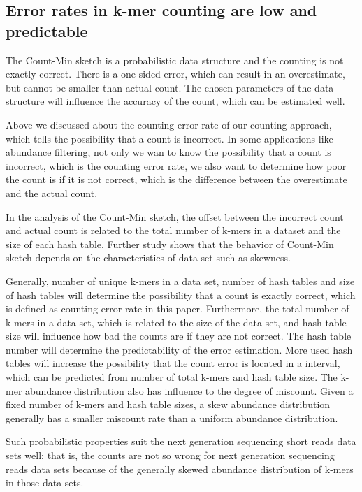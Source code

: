 \documentclass{article}
\begin{document}
\subsection{Error rates in k-mer counting are low and predictable}

The Count-Min sketch is a probabilistic data structure and the
counting is not exactly correct. There is a one-sided error, which can
result in an overestimate, but cannot be smaller than actual
count. The chosen parameters of the data structure will influence the
accuracy of the count, which can be estimated well\cite{Cormode2005}.

Above we discussed about the counting error rate of our counting
approach, which tells the possibility that a count is incorrect.  In
some applications like abundance filtering, not only we wan to know
the possibility that a count is incorrect, which is the counting error
rate, we also want to determine how poor the count is if it is not
correct, which is the difference between the overestimate and the
actual count.

In the analysis of the Count-Min sketch\cite{Cormode2005}, the offset
between the incorrect count and actual count is related to the total
number of k-mers in a dataset and the size of each hash table. Further
study shows that the behavior of Count-Min sketch depends on the
characteristics of data set such as skewness\cite{Rusu2008}.

Generally, number of unique k-mers in a data set, number of hash
tables and size of hash tables will determine the possibility that a
count is exactly correct, which is defined as counting error rate in
this paper. Furthermore, the total number of k-mers in a data set,
which is related to the size of the data set, and hash table size will
influence how bad the counts are if they are not correct. The hash
table number will determine the predictability of the error
estimation. More used hash tables will increase the possibility that
the count error is located in a interval, which can be predicted from
number of total k-mers and hash table size. The k-mer abundance
distribution also has influence to the degree of miscount. Given a
fixed number of k-mers and hash table sizes, a skew abundance
distribution generally has a smaller miscount rate than a uniform
abundance distribution.

Such probabilistic properties suit the next generation sequencing
short reads data sets well; that is, the counts are not so wrong for
next generation sequencing reads data sets because of the generally
skewed abundance distribution of k-mers in those data sets.
\end{document}
